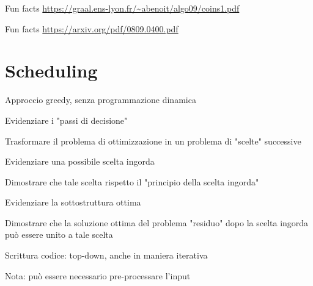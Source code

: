 \begin{OnlySlides}{Fun facts}
\vspace{-12pt}
\tiny 
\url{https://graal.ens-lyon.fr/~abenoit/algo09/coins1.pdf}
\end{OnlySlides}


\begin{OnlySlides}{Fun facts}
\vspace{-12pt}
\tiny
\url{https://arxiv.org/pdf/0809.0400.pdf}
\end{OnlySlides}


\section{Scheduling}

\begin{frame}{Approccio greedy, senza programmazione dinamica}


\BIL
\item \alert{Evidenziare i "passi di decisione"}
\BI
\item Trasformare il problema di ottimizzazione in un problema di "scelte" successive
\EI

\item \alert{Evidenziare una possibile scelta ingorda}
\BI
\item Dimostrare che tale scelta rispetto il "principio della scelta ingorda"
\EI

\item \alert{Evidenziare la sottostruttura ottima}
\BI
\item Dimostrare che la soluzione ottima del problema "residuo" dopo la scelta ingorda può essere unito a tale scelta
\EI

\item \alert{Scrittura codice: top-down, anche in maniera iterativa}
\BI
\item Nota: può essere necessario pre-processare l'input
\EI
\EIL
\end{frame}



